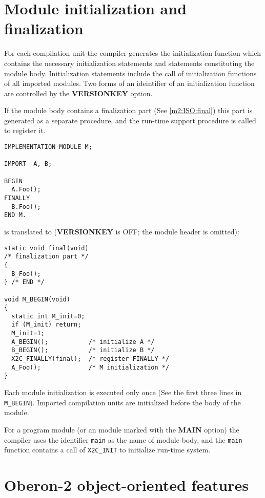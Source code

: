 
\section{Module initialization and finalization}

For   each   compilation   unit   the   compiler   generates  the
initialization  function  which contains the necessary initialization
statements and statements constituting  the  module  body.
Initialization  statements  include  the  call  of initialization
functions  of  all  imported  modules.  Two  forms of an ideintifier
of an initialization function are  controlled  by  the  {\bf  VERSIONKEY}
option.

If    the   module   body   contains a finalization   part   (See
\ref{m2:ISO:final})   this   part  is  generated  as  a  separate
procedure, and the  run-time support procedure is called
to register it.

\Example
\begin{verbatim}
IMPLEMENTATION MODULE M;

IMPORT  A, B;

BEGIN
  A.Foo();
FINALLY
  B.Foo();
END M.
\end{verbatim}
is translated to ({\bf VERSIONKEY} is OFF; the module header is omitted):
\begin{verbatim}
static void final(void)
/* finalization part */
{
  B_Foo();
} /* END */

void M_BEGIN(void)
{
  static int M_init=0;
  if (M_init) return;
  M_init=1;
  A_BEGIN();           /* initialize A */
  B_BEGIN();           /* initialize B */
  X2C_FINALLY(final);  /* register FINALLY */
  A_Foo();             /* M initialization */
}
\end{verbatim}

Each module initialization is executed only once (See the first
three lines in \verb+M_BEGIN+). Imported compilation units
are initialized before the body of the module.

For  a program module (or an \ot{} module marked with the {\bf MAIN}
option)  the  compiler  uses the identifier {\tt main} as the name of
module  body,  and the {\tt main} function contains a call of
\verb+X2C_INIT+ to initialize run-time system.


\section{Oberon-2 object-oriented features}\label{maptoc:o2}

